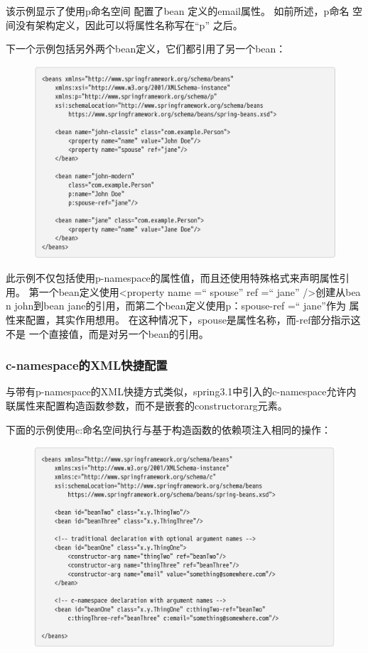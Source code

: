 该示例显示了使用p命名空间
配置了bean 定义的email属性。
如前所述，p命名
空间没有架构定义，因此可以将属性名称写在“p” 之后。

下一个示例包括另外两个bean定义，它们都引用了另一个bean：

\begin{figure}[ht]
    \centering
    \includegraphics[width=1\linewidth]{./Figure/IMG_code_51.png}
\end{figure}

此示例不仅包括使用p-namespace的属性值，而且还使用特殊格式来声明属性引用。 
第一个bean定义使用<property name =“ spouse” ref =“ jane” />创建从bea
n john到bean jane的引用，而第二个bean定义使用p：spouse-ref =“ jane”作为
属性来配置，其实作用想用。 在这种情况下，spouse是属性名称，而-ref部分指示这不是
一个直接值，而是对另一个bean的引用。

\subsubsection{c-namespace的XML快捷配置}

与带有p-namespace的XML快捷方式类似，spring3.1中引入的c-namespace允许内联属性来配置构造函数参数，而不是嵌套的constructorarg元素。

下面的示例使用c:命名空间执行与基于构造函数的依赖项注入相同的操作：

\begin{figure}[ht]
    \centering
    \includegraphics[width=1\linewidth]{./Figure/IMG_code_52.png}
\end{figure}

